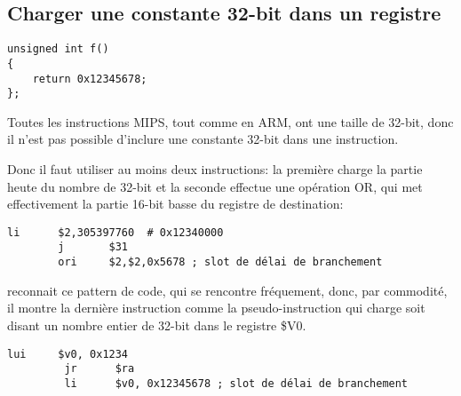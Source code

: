 ﻿\subsection{Charger une constante 32-bit dans un registre}
\label{MIPS_big_constants}

\begin{lstlisting}[style=customc]
unsigned int f()
{
	return 0x12345678;
};
\end{lstlisting}

Toutes les instructions MIPS, tout comme en ARM, ont une taille de 32-bit, donc il
n'est pas possible d'inclure une constante 32-bit dans une instruction.

Donc il faut utiliser au moins deux instructions:
la première charge la partie heute du nombre de 32-bit et la seconde effectue une
opération OR, qui met effectivement la partie 16-bit basse du registre de destination:

\begin{lstlisting}[caption=GCC 4.4.5 -O3 (\assemblyOutput),style=customasmMIPS]
        li      $2,305397760  # 0x12340000
        j       $31
        ori     $2,$2,0x5678 ; slot de délai de branchement
\end{lstlisting}

\IDA reconnait ce pattern de code, qui se rencontre fréquement, donc, par commodité,
il montre la dernière instruction  comme la pseudo-instruction  qui
charge soit disant un nombre entier de 32-bit dans le registre \$V0. %


\begin{lstlisting}[caption=GCC 4.4.5 -O3 (IDA),style=customasmMIPS]
         lui     $v0, 0x1234
         jr      $ra
         li      $v0, 0x12345678 ; slot de délai de branchement
\end{lstlisting}

